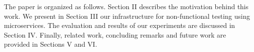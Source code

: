  

The paper is organized as follows.
Section II describes the motivation behind this work. We present in Section III our infrastructure for non-functional testing using microservices. 
The evaluation and results of our experiments are discussed in Section IV. 
Finally, related work, concluding remarks and future work are provided in Sections V and VI.




 
 


